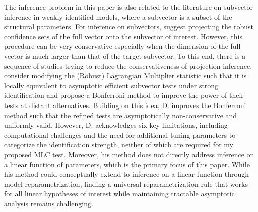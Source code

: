 \documentclass[11pt]{article}
\theoremstyle{definition}
\newcommand{\0}{\ensuremath{\mathbf{0}}}
\begin{document}
\begin{bibunit}
The inference problem in this paper is also related to the literature on subvector inference in weakly identified models, where a subvector is a subset of the structural parameters. For inference on subvectors, \cite{dufour/mohamed:2005} suggest projecting the robust confidence sets of the full vector onto the subvector of interest. However, this procedure can be very conservative especially when the dimension of the full vector is much larger than that of the target subvector. To this end, there is a sequence of studies trying to reduce the conservativeness of projection inference. \cite{chaudhuri/zivot:2011} consider modifying the (Robust) Lagrangian Multiplier statistic \citep{kleibergen:2005} such that it is locally equivalent to asymptotic efficient subvector tests under strong identification and propose a Bonferroni method to improve the power of their tests at distant alternatives. Building on this idea, D. \cite{andrews.d:2017} improves the Bonferroni method such that the refined tests are asymptotically non-conservative and uniformly valid. However, D. \citet[page 2]{andrews.d:2017} acknowledges six key limitations, including computational challenges and the need for additional tuning parameters to categorize the identification strength, neither of which are required for my proposed MLC test. Moreover, his method does not directly address inference on a linear function of parameters, which is the primary focus of this paper. While his method could conceptually extend to inference on a linear function through model reparametrization, finding a universal reparametrization rule that works for all linear hypotheses of interest while maintaining tractable asymptotic analysis remains challenging.



\end{bibunit}
\end{document}
